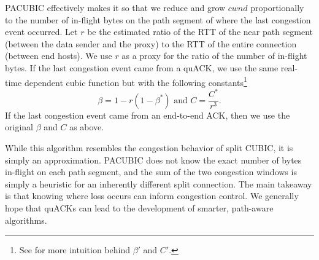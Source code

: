 PACUBIC effectively makes it so that we reduce and grow $cwnd$
proportionally to the number of in-flight bytes on the path segment
of where the last congestion event occurred.
Let $r$ be the estimated ratio of the RTT of the near path segment
(between the data sender and the proxy) to the RTT of the entire connection
(between end hosts).
We use $r$ as a proxy for the ratio of the number of in-flight bytes.
If the last congestion event came from a quACK, we use the same real-time
dependent cubic function but with the following
constants\footnote{See  for more intuition behind $\beta'$ and $C'$.}
\[
\beta = 1 - r(1-\beta^*)\text{ and }C = \frac{C^*}{r^3}.
\]
\noindent If the last congestion event came from an end-to-end ACK, then we use
the original $\beta$ and $C$ as above.

While this algorithm resembles the congestion behavior of split CUBIC, it is
simply an approximation. PACUBIC does not know the exact number of bytes
in-flight on each path segment, and the sum of the two congestion windows is simply a
heuristic for an inherently different split connection. The main takeaway is
that knowing where loss occurs can inform congestion control. We generally
hope that quACKs can lead to the development of smarter, path-aware algorithms.
